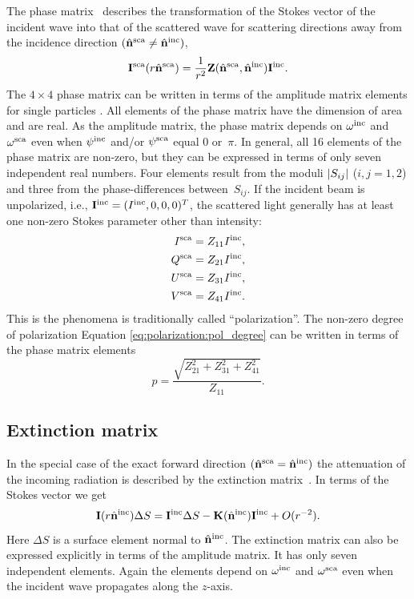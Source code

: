 The phase matrix \PhaMat\ describes the transformation of the Stokes
vector of the incident wave into that of the scattered wave for
scattering directions away from the incidence direction
$(\hat{{\bf n}}^{\mathrm{sca}}\neq\hat{{\bf n}}^{\mathrm{inc}})$,
\begin{equation}
  \label{eq:rtetheory:phase_matrix}
  {\bf I}^{\mathrm{sca}}(r \hat{{\bf n}}^{\mathrm{sca}}) =
    \frac{1}{r^2}{\bf Z}(\hat{{\bf n}}^{\mathrm{sca}},\hat{{\bf n}}^{\mathrm{inc}}) {\bf I}^{\mathrm{inc}}.
\end{equation}
The $4\times4$ phase matrix can be written in terms of the amplitude
matrix elements for single particles \citep{Mishchenko:02}. All
elements of the phase matrix have the dimension of area and are real.
As the amplitude matrix, the phase matrix depends on $\omega^{\mathrm{inc}}$
and $\omega^{\mathrm{sca}}$ even when $\psi^{\mathrm{inc}}$ and/or $\psi^{\mathrm{sca}}$ equal
0 or~$\pi$.  In general, all 16 elements of the phase matrix are
non-zero, but they can be expressed in terms of only seven independent
real numbers. Four elements result from the moduli $\left| S_{ij} \right| $ ($i,j =
1,2$) and three from the phase-differences between~$S_{ij}$.  If the
incident beam is unpolarized, i.e., ${\bf I}^{\mathrm{inc}} = (I^{\mathrm{inc}},
0, 0, 0)^T$, the scattered light generally has at least one
non-zero Stokes parameter other than intensity:
\begin{eqnarray}
  I^{\mathrm{sca}} &= Z_{11}I^{\mathrm{inc}},\\
  Q^{\mathrm{sca}} &= Z_{21}I^{\mathrm{inc}},\\
  U^{\mathrm{sca}} &= Z_{31}I^{\mathrm{inc}},\\
  V^{\mathrm{sca}} &= Z_{41}I^{\mathrm{inc}}.
\end{eqnarray}
This is the phenomena is traditionally called ``polarization''. The
non-zero degree of polarization Equation \ref{eq:polarization:pol_degree}
can be written in terms of the phase matrix elements
\begin{equation}
  p = \frac{\sqrt{Z_{21}^2+Z_{31}^2+Z_{41}^2}}{Z_{11}}.
\end{equation}


\subsection{Extinction matrix}
\label{sec:rtetheory:ext_mat}
In the special case of the exact forward direction
$(\hat{{\bf n}}^{\mathrm{sca}}=\hat{{\bf n}}^{\mathrm{inc}})$ the attenuation of the
incoming radiation is described by the extinction matrix~\ExtMat. In
terms of the Stokes vector we get
\begin{equation}
  {\bf I}(r \hat{{\bf n}}^{\mathrm{inc}}) \Delta S =
    {\bf I}^{\mathrm{inc}} \Delta S - {\bf K}(\hat{{\bf n}}^{\mathrm{inc}}) {\bf I}^{\mathrm{inc}} + O(r^{-2}).
\end{equation}
Here $\Delta S$ is a surface element normal to
$\hat{{\bf n}}^{\mathrm{inc}}$.  The extinction matrix can also be expressed
explicitly in terms of the amplitude matrix. It has only seven
independent elements. Again the elements depend on $\omega^{\mathrm{inc}}$ and
$\omega^{\mathrm{sca}}$ even when the incident wave propagates along the
$z$-axis.

